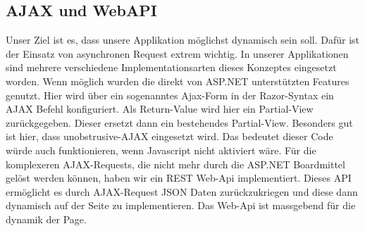 	\subsection{AJAX und WebAPI}
		Unser Ziel ist es, dass unsere Applikation möglichst dynamisch sein soll. Dafür ist der Einsatz von asynchronen Request extrem wichtig. In unserer Applikationen sind mehrere verschiedene Implementationsarten dieses Konzeptes eingesetzt worden. Wenn möglich wurden die direkt von ASP.NET unterstützten Features genutzt. Hier wird über ein sogenanntes Ajax-Form in der Razor-Syntax ein AJAX Befehl konfiguriert. Als Return-Value wird hier ein Partial-View zurückgegeben. Dieser ersetzt dann ein bestehendes Partial-View.
		Besonders gut ist hier, dass unobstrusive-AJAX eingesetzt wird. Das bedeutet dieser Code würde auch funktionieren, wenn Javascript nicht aktiviert wäre.
		Für die komplexeren AJAX-Requests, die nicht mehr durch die ASP.NET Boardmittel gelöst werden können, haben wir ein REST Web-Api implementiert. Dieses API ermöglicht es durch AJAX-Request JSON Daten zurückzukriegen und diese dann dynamisch auf der Seite zu implementieren.
		Das Web-Api ist massgebend für die dynamik der Page.
